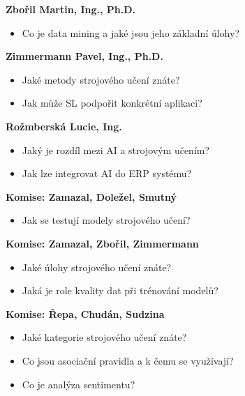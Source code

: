 \begin{profesorbox}
\begin{itemize}
\end{itemize}
\textbf{Zbořil Martin, Ing., Ph.D.}
\begin{itemize}
  \item Co je data mining a jaké jsou jeho základní úlohy?
\end{itemize}
\textbf{Zimmermann Pavel, Ing., Ph.D.}
\begin{itemize}
  \item Jaké metody strojového učení znáte?
  \item Jak může SL podpořit konkrétní aplikaci?
\end{itemize}
\textbf{Rožmberská Lucie, Ing.}
\begin{itemize}
  \item Jaký je rozdíl mezi AI a strojovým učením?
  \item Jak lze integrovat AI do ERP systému?
\end{itemize}
\textbf{Komise: Zamazal, Doležel, Smutný}
\begin{itemize}
  \item Jak se testují modely strojového učení?
\end{itemize}
\textbf{Komise: Zamazal, Zbořil, Zimmermann}
\begin{itemize}
  \item Jaké úlohy strojového učení znáte?
  \item Jaká je role kvality dat při trénování modelů?
\end{itemize}
\textbf{Komise: Řepa, Chudán, Sudzina}
\begin{itemize}
  \item Jaké kategorie strojového učení znáte?
  \item Co jsou asociační pravidla a k čemu se využívají?
  \item Co je analýza sentimentu?
\end{itemize}
\end{profesorbox}
